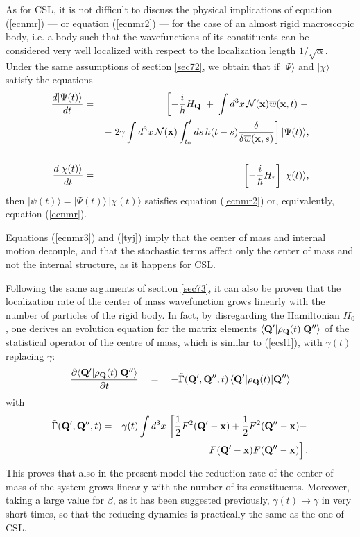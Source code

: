 \documentclass[12pt]{article}
\begin{document}
As for CSL, it is not difficult to discuss the physical
implications of equation (\ref{ecnmr}) --- or equation
(\ref{ecnmr2}) --- for the case of an almost rigid macroscopic  body,
i.e. a body such that the wavefunctions of its constituents can be
considered very well localized with respect to the localization
length $1/\sqrt{\alpha}$. Under the same assumptions of section
\ref{sec72}, we obtain that if $|\Psi\rangle$ and $|\chi\rangle$
satisfy the equations
\begin{eqnarray} \label{ecnmr3}
\frac{d |\Psi(t)\rangle}{dt} & = & \left[ -\frac{i}{\hbar} H_{\bf
Q} \; + \; \int d^{3}x\, {\mathcal N}{(\bf x}) \overline{w}({\bf
x}, t) \; - \right.
\\ & &
\left. - \; 2\gamma \int d^{3}x\, {\mathcal N}({\bf x})
\int_{t_{0}}^{t} ds\, h(t - s) \frac{\delta}{\delta
\overline{w}({\bf x}, s)} \right]|\Psi(t)\rangle, \nonumber
\\
& & \nonumber
\\ \label{tyj} \frac{d |\chi (t)\rangle}{dt}
& = & \left[ -\frac{i}{\hbar} H_{r} \right] |\chi (t)\rangle,
\end{eqnarray}
then $|\psi(t)\rangle = |\Psi(t)\rangle\, |\chi (t)\rangle$
satisfies equation (\ref{ecnmr2}) or, equivalently, equation
(\ref{ecnmr}).

Equations (\ref{ecnmr3}) and (\ref{tyj}) imply that the center of
mass and internal motion decouple, and that the stochastic terms
affect only the center of mass and not the internal structure, as
it happens for CSL.

Following the same arguments of section \ref{sec73}, it can also
be proven that the localization rate of the center  of mass
wavefunction grows linearly with the number of particles of the
rigid body. In fact, by disregarding the Hamiltonian $H_{0}$, one
derives an evolution equation for the matrix elements $\langle
{\bf Q}'|\rho_{\bf Q}(t)|{\bf Q}''\rangle$ of the statistical
operator  of the centre of mass, which is similar to
(\ref{ecsl1}), with
$\gamma(t)$ replacing
$\gamma$:
\begin{equation}
\frac{\partial \langle {\bf Q}'|\rho_{\bf Q}(t)|{\bf
Q}''\rangle}{\partial t} \quad = \quad - \tilde{\Gamma}({\bf Q}',
{\bf Q}'', t) \, \langle {\bf Q}'|\rho_{\bf Q}(t)|{\bf Q}''\rangle
\end{equation}
with
\begin{eqnarray}
\tilde{\Gamma}({\bf Q}', {\bf Q}'', t) & = & \gamma(t) \int
d^{3}x\, \left[ \frac{1}{2} F^{2}({\bf Q}' - {\bf x}) +
\frac{1}{2}
F^{2}({\bf Q}'' - {\bf x}) - \right. \nonumber \\
& & \left. \frac{}{} F({\bf Q}' - {\bf x}) F({\bf Q}'' - {\bf x})
\right].
\end{eqnarray}
This proves that also in the present model the reduction rate of
the center of mass of the system grows linearly with the number of
its constituents. Moreover, taking a large value for $\beta$, as
it has been suggested previously, $\gamma(t) \rightarrow \gamma$
in very short times, so that the reducing dynamics is practically
the same as the one of CSL.
\end{document}

